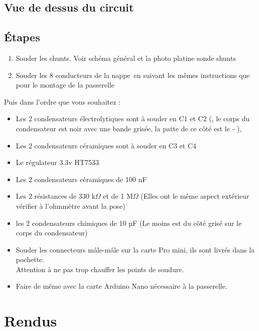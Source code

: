 \subsection{Vue de dessus du circuit}
\label{TEST}


\subsection{Étapes}
\begin{enumerate}
\item Souder les shunts. Voir schéma général et la photo platine sonde shunts
\item Souder les 8 conducteurs de la nappe en suivant les mêmes instructions que pour le montage de la passerelle
\end{enumerate}
Puis dans l'ordre que vous souhaitez : 
\begin{itemize}
    \item Les 2 condensateurs électrolytiques sont à souder en C1 et C2 ({\color{red}{sont polarisées}}, le corps du condensateur est noir avec une bande grisée, la patte de ce côté est le - ),
    \item Les 2 condensateurs céramiques sont à souder en C3 et C4
    \item Le régulateur 3.3v HT7533\\

    \item Les 2 condensateurs céramiques de 100 nF
    \item Les 2 résistances de 330 k$\Omega$ et de 1 M$\Omega$    (Elles ont le même aspect extérieur vérifier à l’ohmmètre avant la pose)
    \item les 2 condensateurs chimiques de 10 µF	(Le moins est du côté grisé sur le corps du condensateur)
    \item Souder les connecteurs mâle-mâle sur la carte Pro mini, ils sont livrés dans la pochette.\\ Attention à ne pas trop chauffer les points de soudure.
    \item Faire de même avec la carte Arduino Nano nécessaire à la passerelle.
\end{itemize}

\section{Rendus}







